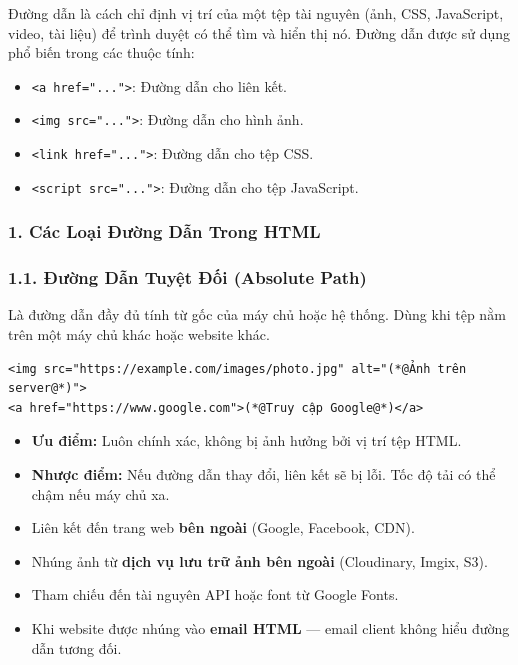 \documentclass[11pt,oneside]{book}
\newcommand{\codeinline}[1]{\textcolor{accentOrange}{\texttt{#1}}}
\begin{document}
\begin{conceptBox}
Đường dẫn là cách chỉ định vị trí của một tệp tài nguyên (ảnh, CSS, JavaScript, video, tài liệu) để trình duyệt có thể tìm và hiển thị nó. Đường dẫn được sử dụng phổ biến trong các thuộc tính:
\begin{itemize}[leftmargin=1.5em, itemsep=2pt, parsep=0pt]
    \item \codeinline{<a href="...">}: Đường dẫn cho liên kết.
    \item \codeinline{<img src="...">}: Đường dẫn cho hình ảnh.
    \item \codeinline{<link href="...">}: Đường dẫn cho tệp CSS.
    \item \codeinline{<script src="...">}: Đường dẫn cho tệp JavaScript.
\end{itemize}
\end{conceptBox}

\subsubsection{1. Các Loại Đường Dẫn Trong HTML}

\subsubsection*{1.1. Đường Dẫn Tuyệt Đối (Absolute Path)}

Là đường dẫn đầy đủ tính từ gốc của máy chủ hoặc hệ thống. Dùng khi tệp nằm trên một máy chủ khác hoặc website khác.

\begin{codeWindow}
\begin{lstlisting}[language=HTML5]
<img src="https://example.com/images/photo.jpg" alt="(*@Ảnh trên server@*)">
<a href="https://www.google.com">(*@Truy cập Google@*)</a>
\end{lstlisting}
\end{codeWindow}

\begin{itemize}[leftmargin=1.5em, itemsep=2pt, parsep=0pt]
    \item \textbf{Ưu điểm:} Luôn chính xác, không bị ảnh hưởng bởi vị trí tệp HTML.
    \item \textbf{Nhược điểm:} Nếu đường dẫn thay đổi, liên kết sẽ bị lỗi. Tốc độ tải có thể chậm nếu máy chủ xa.
\end{itemize}

\begin{tipBox}
\begin{itemize}[leftmargin=1.5em, itemsep=2pt, parsep=0pt]
    \item Liên kết đến trang web \textbf{bên ngoài} (Google, Facebook, CDN).
    \item Nhúng ảnh từ \textbf{dịch vụ lưu trữ ảnh bên ngoài} (Cloudinary, Imgix, S3).
    \item Tham chiếu đến tài nguyên API hoặc font từ Google Fonts.
    \item Khi website được nhúng vào \textbf{email HTML} — email client không hiểu đường dẫn tương đối.
\end{itemize}
\end{tipBox}
\end{document}
